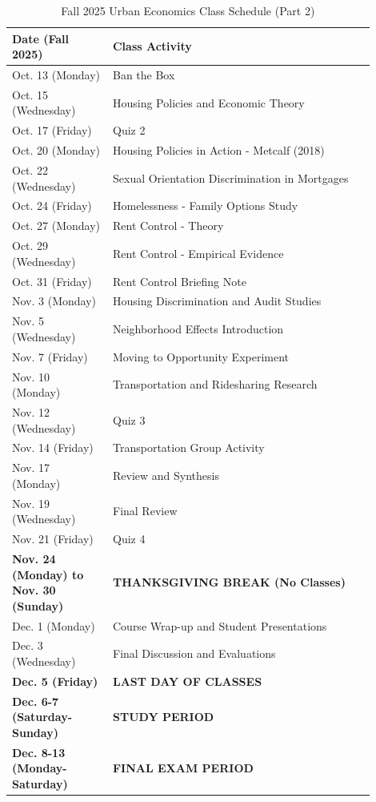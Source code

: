 \documentclass[11pt,letterpaper,final]{article}
\begin{document}
\newpage

\begin{table}[H]
\centering
{}
\begin{tabular}{@{}p{0.25\linewidth}p{0.65\linewidth}@{}}
\toprule
\textbf{Date (Fall 2025)} & \textbf{Class Activity} \\
\midrule
Oct. 13 (Monday) & Ban the Box \\
Oct. 15 (Wednesday) & Housing Policies and Economic Theory \\
Oct. 17 (Friday) & Quiz 2 \\
Oct. 20 (Monday) & Housing Policies in Action - Metcalf (2018) \\
Oct. 22 (Wednesday) & Sexual Orientation Discrimination in Mortgages \\
Oct. 24 (Friday) & Homelessness - Family Options Study \\
Oct. 27 (Monday) & Rent Control - Theory \\
Oct. 29 (Wednesday) & Rent Control - Empirical Evidence \\
Oct. 31 (Friday) & Rent Control Briefing Note \\
Nov. 3 (Monday) & Housing Discrimination and Audit Studies \\
Nov. 5 (Wednesday) & Neighborhood Effects Introduction \\
Nov. 7 (Friday) & Moving to Opportunity Experiment \\
Nov. 10 (Monday) & Transportation and Ridesharing Research \\
Nov. 12 (Wednesday) & Quiz 3 \\
Nov. 14 (Friday) & Transportation Group Activity \\
Nov. 17 (Monday) & Review and Synthesis \\
Nov. 19 (Wednesday) & Final Review \\
Nov. 21 (Friday) & Quiz 4 \\
\textbf{Nov. 24 (Monday) to Nov. 30 (Sunday)} & \textbf{THANKSGIVING BREAK (No Classes)} \\
Dec. 1 (Monday) & Course Wrap-up and Student Presentations \\
Dec. 3 (Wednesday) & Final Discussion and Evaluations \\
\textbf{Dec. 5 (Friday)} & \textbf{LAST DAY OF CLASSES} \\
\textbf{Dec. 6-7 (Saturday-Sunday)} & \textbf{STUDY PERIOD} \\
\textbf{Dec. 8-13 (Monday-Saturday)} & \textbf{FINAL EXAM PERIOD} \\
\bottomrule
\end{tabular}
\caption{Fall 2025 Urban Economics Class Schedule (Part 2)}
\end{table}
\end{document}
